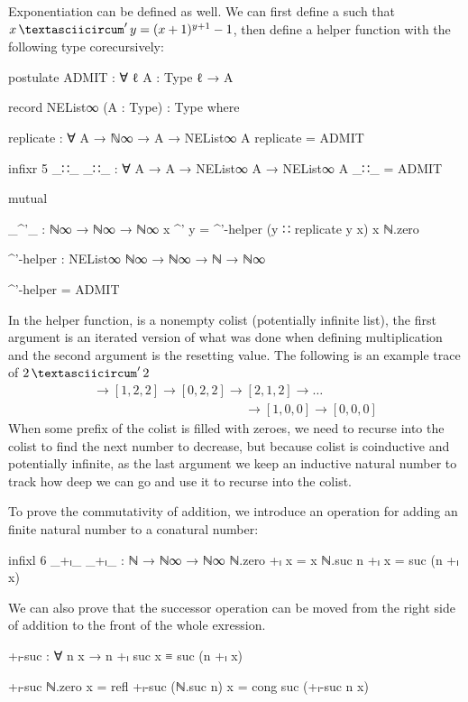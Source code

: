Exponentiation can be defined as well. We can first define a
 such that $x \mathop{\textasciicircum}' y =
(x+1)^{y+1}-1$, then define a helper function with the following type
corecursively:
\begin{code}[hide]
postulate
  ADMIT : ∀ {ℓ} {A : Type ℓ} → A

record NEList∞ (A : Type) : Type where

replicate : ∀ {A} → ℕ∞ → A → NEList∞ A
replicate = ADMIT

infixr 5 _∷_
_∷_ : ∀ {A} → A → NEList∞ A → NEList∞ A
_∷_ = ADMIT

mutual
\end{code}
\begin{code}
  _^'_ : ℕ∞ → ℕ∞ → ℕ∞
  x ^' y = ^'-helper (y ∷ replicate y x) x ℕ.zero

  ^'-helper : NEList∞ ℕ∞ → ℕ∞ → ℕ → ℕ∞
\end{code}
\begin{code}[hide]
  ^'-helper = ADMIT
\end{code}
In the helper function,  is a nonempty colist (potentially
infinite list), the first argument is an iterated version of what was done when
defining multiplication and the second argument is the resetting value. The
following is an example trace of $2 \mathop{\textasciicircum}' 2$
\begin{gather*}
  [2, 2, 2] \to [1, 2, 2] \to [0, 2, 2] \to [2, 1, 2] \to \dots \\
  \qquad\qquad\qquad\qquad\qquad\qquad\to [1, 0, 0] \to [0, 0, 0]
\end{gather*}
When some prefix of the colist is filled with zeroes, we need to recurse into
the colist to find the next number to decrease, but because colist is
coinductive and potentially infinite, as the last argument we keep an inductive
natural number to track how deep we can go and use it to recurse into the
colist.

To prove the commutativity of addition, we introduce an operation for adding an
finite natural number to a conatural number:
\begin{code}
infixl 6 _+ₗ_
_+ₗ_ : ℕ → ℕ∞ → ℕ∞
ℕ.zero +ₗ x = x
ℕ.suc n +ₗ x = suc (n +ₗ x)
\end{code}
We can also prove that the successor operation can be moved from the right side
of addition to the front of the whole exression.
\begin{code}
+ₗ-suc : ∀ n x → n +ₗ suc x ≡ suc (n +ₗ x)
\end{code}
\begin{code}[hide]
+ₗ-suc ℕ.zero x = refl
+ₗ-suc (ℕ.suc n) x = cong suc (+ₗ-suc n x)
\end{code}

